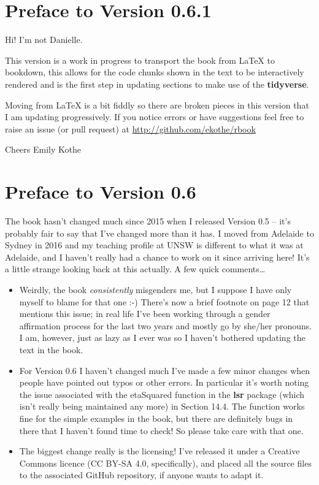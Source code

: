 \documentclass[]{book}
\providecommand{\tightlist}{%
  \setlength{\itemsep}{0pt}\setlength{\parskip}{0pt}}
\begin{document}
\hypertarget{preface-to-version-0.6.1}{%
\section{Preface to Version 0.6.1}\label{preface-to-version-0.6.1}}

Hi! I'm not Danielle.

This version is a work in progress to transport the book from LaTeX to bookdown, this allows for the code chunks shown in the text to be interactively rendered and is the first step in updating sections to make use of the \textbf{tidyverse}.

Moving from LaTeX is a bit fiddly so there are broken pieces in this version that I am updating progressively. If you notice errors or have suggestions feel free to raise an issue (or pull request) at \url{http://github.com/ekothe/rbook}

Cheers
Emily Kothe

\hypertarget{preface-to-version-0.6}{%
\section{Preface to Version 0.6}\label{preface-to-version-0.6}}

The book hasn't changed much since 2015 when I released Version 0.5 -- it's probably fair to say that I've changed more than it has. I moved from Adelaide to Sydney in 2016 and my teaching profile at UNSW is different to what it was at Adelaide, and I haven't really had a chance to work on it since arriving here! It's a little strange looking back at this actually. A few quick comments\ldots{}

\begin{itemize}
\tightlist
\item
  Weirdly, the book \emph{consistently} misgenders me, but I suppose I have only myself to blame for that one :-) There's now a brief footnote on page 12 that mentions this issue; in real life I've been working through a gender affirmation process for the last two years and mostly go by she/her pronouns. I am, however, just as lazy as I ever was so I haven't bothered updating the text in the book.\\
\item
  For Version 0.6 I haven't changed much I've made a few minor changes when people have pointed out typos or other errors. In particular it's worth noting the issue associated with the etaSquared function in the \textbf{lsr} package (which isn't really being maintained any more) in Section 14.4. The function works fine for the simple examples in the book, but there are definitely bugs in there that I haven't found time to check! So please take care with that one.
\item
  The biggest change really is the licensing! I've released it under a Creative Commons licence (CC BY-SA 4.0, specifically), and placed all the source files to the associated GitHub repository, if anyone wants to adapt it.
\end{itemize}
\end{document}
